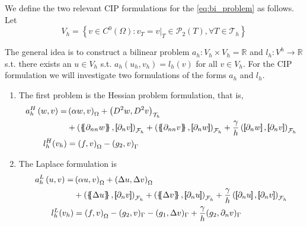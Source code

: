 We define the two relevant CIP formulations for the \eqref{eq:bi_problem} as follows. Let $$V_{h} = \left\{ v \in C^{0}\left( \Omega  \right): v_{T} = v | _{T} \in \mathcal{P} _{2}\left( T \right), \forall T \in
\mathcal{T}_{h}    \right\}$$

The general idea is to construct a bilinear problem $a_{h}: V_{h} \times  V_{h} = \mathbb{R} $ and $l_{h}: V^{h} \to \mathbb{R} $ s.t. there exists an $u \in V_{h}$ s.t. $a_{h}( u_{h}, v_{h}) = l_{h}( v) $ for all $v \in V_{h}$. For the CIP
formulation we will investigate two formulations of the forms $a_{h}$ and $l_{h}$.

\begin{enumerate}[label=\arabic*)]
    \item The first problem is the Hessian problem formulation, that is,
\begin{equation}
\begin{split}
a_{h}^{H} \left( w, v \right)   =&
    \left( \alpha  w, v \right) _{\Omega }   +  \left( D^2 w, D^2v \right) _{\mathcal{T} _{h}} \\
 & +
  \left( \mean{  \partial _{n n} w }, \jump{ \partial _{n }v} \right)_{\mathcal{F}_{h}}  +
 \left( \mean{ \partial _{n n} v }, \jump{ \partial _{n}w }      \right)_{\mathcal{F}_{h}}  + \frac{\gamma }{h}  \left( \jump{ \partial _{n} w}, \jump{ \partial _{n} v   }   \right)_{\mathcal{F}_{h}} \\
 l_{h}^{H}( v_{h}) & =  \left( f, v \right) _{\Omega }  - \left(g_{2}, v  \right) _{\Gamma }
\end{split}
\end{equation}

\item The Laplace formulation is
    \begin{equation}
        \begin{split}
            a_{h}^{L} \left( u, v \right)   =&
            \left( \alpha  u, v \right) _{\Omega }   +  \left( \Delta  u, \Delta v \right) _{ \Omega } \\
                                             & + \left( \mean{  \Delta  u }, \jump{ \partial _{n }v} \right)_{\mathcal{F}_{h}  }  + \left( \mean{ \Delta  v }, \jump{ \partial _{n}u }      \right)_{\mathcal{F}_{h}  }  + \frac{\gamma }{h}  \left( \jump{ \partial _{n} u}, \jump{ \partial _{n} v   }   \right)_{\mathcal{F}_{h} } \\
                                             l^{L}_{h}( v_{h}) & =  \left( f, v \right) _{\Omega } - ( g_{2},  v )_{\Gamma } -  ( g_{1}, \Delta  v  )_{\Gamma }  + \frac{\gamma }{h} ( g_{2}, \partial _{n} v  )_{\Gamma }
                                         \end{split}
                                     \end{equation}

\end{enumerate}



